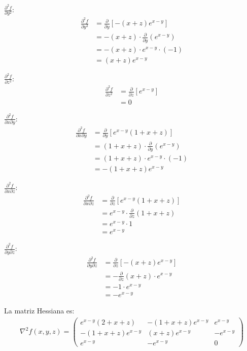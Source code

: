 \documentclass{article}
\begin{document}
$\frac{\partial^2 f}{\partial y^2}$:
\begin{align}
\frac{\partial^2 f}{\partial y^2} &= \frac{\partial}{\partial y}[-(x + z)e^{x-y}] \\
&= -(x + z) \cdot \frac{\partial}{\partial y}(e^{x-y}) \\
&= -(x + z) \cdot e^{x-y} \cdot (-1) \\
&= (x + z)e^{x-y}
\end{align}

$\frac{\partial^2 f}{\partial z^2}$:
\begin{align}
\frac{\partial^2 f}{\partial z^2} &= \frac{\partial}{\partial z}[e^{x-y}] \\
&= 0
\end{align}

$\frac{\partial^2 f}{\partial x \partial y}$:
\begin{align}
\frac{\partial^2 f}{\partial x \partial y} &= \frac{\partial}{\partial y}[e^{x-y}(1 + x + z)] \\
&= (1 + x + z) \cdot \frac{\partial}{\partial y}(e^{x-y}) \\
&= (1 + x + z) \cdot e^{x-y} \cdot (-1) \\
&= -(1 + x + z)e^{x-y}
\end{align}

$\frac{\partial^2 f}{\partial x \partial z}$:
\begin{align}
\frac{\partial^2 f}{\partial x \partial z} &= \frac{\partial}{\partial z}[e^{x-y}(1 + x + z)] \\
&= e^{x-y} \cdot \frac{\partial}{\partial z}(1 + x + z) \\
&= e^{x-y} \cdot 1 \\
&= e^{x-y}
\end{align}

$\frac{\partial^2 f}{\partial y \partial z}$:
\begin{align}
\frac{\partial^2 f}{\partial y \partial z} &= \frac{\partial}{\partial z}[-(x + z)e^{x-y}] \\
&= -\frac{\partial}{\partial z}(x + z) \cdot e^{x-y} \\
&= -1 \cdot e^{x-y} \\
&= -e^{x-y}
\end{align}

La matriz Hessiana es:
\begin{align}
\nabla^2 f(x,y,z) = \begin{pmatrix}
e^{x-y}(2 + x + z) & -(1 + x + z)e^{x-y} & e^{x-y} \\
-(1 + x + z)e^{x-y} & (x + z)e^{x-y} & -e^{x-y} \\
e^{x-y} & -e^{x-y} & 0
\end{pmatrix}
\end{align}
\end{document}
